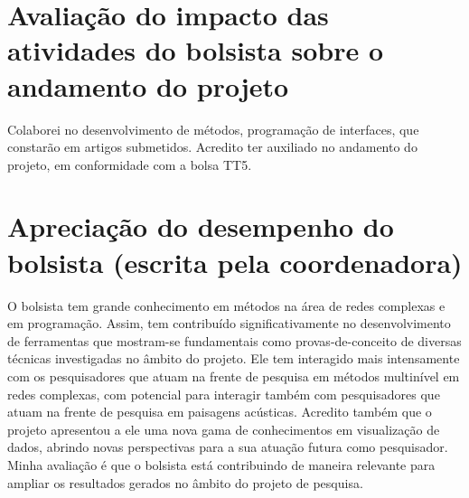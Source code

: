 \documentclass[a4paper, 11pt]{article}
\begin{document}
\section{Avaliação do impacto das atividades do bolsista sobre o andamento do projeto}
Colaborei no desenvolvimento de métodos, programação de interfaces,
que constarão em artigos submetidos.
Acredito ter auxiliado no andamento do projeto, em conformidade com a bolsa TT5.

\section{Apreciação do desempenho do bolsista (escrita pela coordenadora)}
O bolsista tem grande conhecimento em métodos na área de redes complexas e em programação. Assim, tem contribuído significativamente no desenvolvimento de ferramentas que mostram-se fundamentais como provas-de-conceito de diversas técnicas investigadas no âmbito do projeto. Ele tem interagido mais intensamente com os pesquisadores que atuam na frente de pesquisa em métodos multinível em redes complexas, com potencial para interagir também com pesquisadores que atuam na frente de pesquisa em paisagens acústicas. Acredito também que o projeto apresentou a ele uma nova gama de conhecimentos em visualização de dados, abrindo novas perspectivas para a sua atuação futura como pesquisador. Minha avaliação é que o bolsista está contribuindo de maneira relevante para ampliar os resultados gerados no âmbito do projeto de pesquisa.


\end{document}
